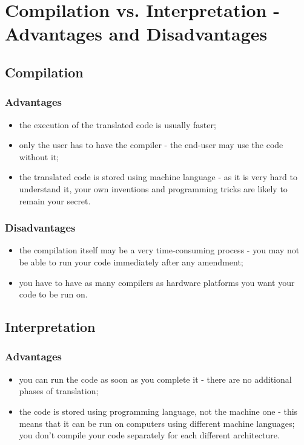 \documentclass[a4paper,10pt]{article}
\begin{document}
\section{Compilation vs. Interpretation - Advantages and Disadvantages}
\subsection{Compilation}
\subsubsection{Advantages}
\begin{itemize}
 \item the execution of the translated code is usually faster;
 \item only the user has to have the compiler - the end-user may use the code without it;
 \item the translated code is stored using machine language - as it is very hard to understand it, your own inventions and programming tricks are likely to remain your secret.
\end{itemize}
\subsubsection{Disadvantages}
\begin{itemize}
 \item the compilation itself may be a very time-consuming process - you may not be able to run your code immediately after any amendment;
 \item you have to have as many compilers as hardware platforms you want your code to be run on.
\end{itemize}

\subsection{Interpretation}
\subsubsection{Advantages}
\begin{itemize}
 \item you can run the code as soon as you complete it - there are no additional phases of translation;
 \item the code is stored using programming language, not the machine one - this means that it can be run on computers using different machine languages; you don't compile your code separately for each different architecture.
\end{itemize}
\end{document}
